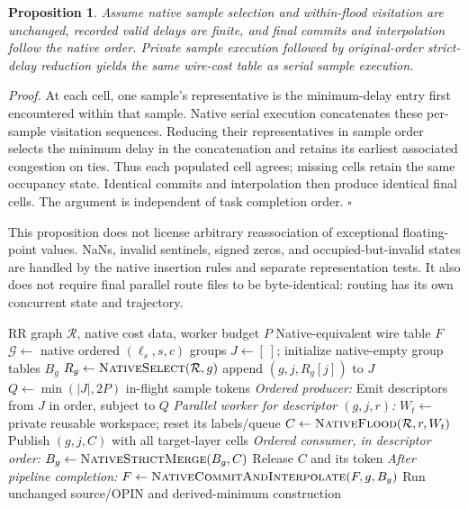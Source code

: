 \documentclass[conference,10pt,letterpaper]{IEEEtran}
\newtheorem{proposition}{Proposition}
\begin{document}
\begin{proposition}
Assume native sample selection and within-flood visitation are unchanged, recorded valid delays are finite, and final commits and interpolation follow the native order. Private sample execution followed by original-order strict-delay reduction yields the same wire-cost table as serial sample execution.
\end{proposition}
\noindent\emph{Proof.}
At each cell, one sample's representative is the minimum-delay entry first encountered within that sample. Native serial execution concatenates these per-sample visitation sequences. Reducing their representatives in sample order selects the minimum delay in the concatenation and retains its earliest associated congestion on ties. Thus each populated cell agrees; missing cells retain the same occupancy state. Identical commits and interpolation then produce identical final cells. The argument is independent of task completion order. $\square$

This proposition does not license arbitrary reassociation of exceptional floating-point values. NaNs, invalid sentinels, signed zeros, and occupied-but-invalid states are handled by the native insertion rules and separate representation tests. It also does not require final parallel route files to be byte-identical: routing has its own concurrent state and trajectory.

\begin{algorithm}[t]
\caption{Layer-aware cross-group Pipeline construction}
\label{alg:pipeline}
\footnotesize
\begin{algorithmic}[1]
\Require RR graph $\mathcal R$, native cost data, worker budget $P$
\Ensure Native-equivalent wire table $F$
\State $\mathcal G\gets$ native ordered $(\ell_s,s,c)$ groups
\State $J\gets[\ ]$; initialize native-empty group tables $B_g$
 \State $R_g\gets\Call{NativeSelect}{\mathcal R,g}$
  \State append $(g,j,R_g[j])$ to $J$
 \EndFor
\EndFor
\State $Q\gets\min(|J|,2P)$ in-flight sample tokens
\Statex \textit{Ordered producer:}
\State Emit descriptors from $J$ in order, subject to $Q$
\Statex \textit{Parallel worker for descriptor $(g,j,r)$:}
\State $W_t\gets$ private reusable workspace; reset its labels/queue
\State $C\gets\Call{NativeFlood}{\mathcal R,r,W_t}$
\State Publish $(g,j,C)$ with all target-layer cells
\Statex \textit{Ordered consumer, in descriptor order:}
\State $B_g\gets\Call{NativeStrictMerge}{B_g,C}$
\State Release $C$ and its token
\Statex \textit{After pipeline completion:}
 \State $F\gets\Call{NativeCommitAndInterpolate}{F,g,B_g}$
\EndFor
\State Run unchanged source/OPIN and derived-minimum construction
\end{algorithmic}
\end{algorithm}
\end{document}

